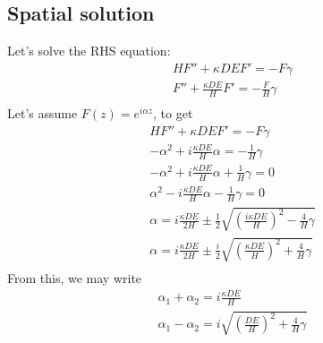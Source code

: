 \documentclass[11pt]{article}
\begin{document}
\subsection{Spatial solution}
Let's solve the RHS equation:
\begin{equation}\begin{aligned}
	H F'' + \kappa DE F' = -F \gamma \\
	F'' + \frac{\kappa DE}{H} F' = -\frac{F}{H} \gamma \\
\end{aligned} \end{equation}
Let's assume $F(z) = e^{i\alpha z}$, to get
\begin{equation}\begin{aligned}
	H F'' + \kappa DE F' = - F \gamma \\
	-\alpha^2 + i \frac{\kappa DE}{H} \alpha = - \frac{1}{H} \gamma \\
	-\alpha^2 + i\frac{\kappa DE}{H} \alpha + \frac{1}{H} \gamma = 0  \\
	\alpha^2 - i\frac{\kappa DE}{H} \alpha - \frac{1}{H} \gamma = 0  \\
	\alpha = i \frac{\kappa DE}{2H} \pm \frac{1}{2} \sqrt{\left(\frac{i \kappa DE}{H}\right)^2 - \frac{4}{H} \gamma} \\
	\alpha = i \frac{\kappa DE}{2H} \pm \frac{i}{2} \sqrt{\left(\frac{\kappa DE}{H}\right)^2 + \frac{4}{H} \gamma} \\
\end{aligned} \end{equation}
From this, we may write
\begin{equation}\begin{aligned}
	\alpha_1 + \alpha_2 = i \frac{\kappa DE}{H} \\
	\alpha_1 - \alpha_2 = i \sqrt{\left(\frac{DE}{H}\right)^2 + \frac{4}{H} \gamma} \\
\end{aligned} \end{equation}
\end{document}
